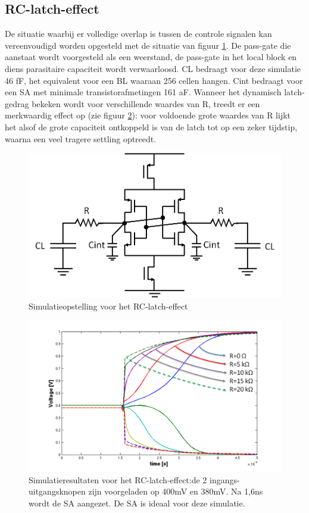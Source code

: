 \subsection{RC-latch-effect}
\label{RC-latch-effect}
De situatie waarbij er volledige overlap is tussen de controle signalen kan vereenvoudigd worden opgesteld met de situatie van figuur \ref{fig:RC-latch}. De pass-gate die aanstaat wordt voorgesteld als een weerstand, de pass-gate in het local block en diens parasitaire capaciteit wordt verwaarloosd. CL bedraagt voor deze simulatie 46 fF, het equivalent voor een BL waaraan 256 cellen hangen. Cint bedraagt voor een SA met minimale transistorafmetingen 161 aF. Wanneer het dynamisch latch-gedrag bekeken wordt voor verschillende waardes van R, treedt er een merkwaardig effect op (zie figuur \ref{fig:RC-latch-sim}): voor voldoende grote waardes van R lijkt het alsof de grote capaciteit ontkoppeld is van de latch tot op een zeker tijdstip, waarna een veel tragere settling optreedt.
\begin{figure}
  \centering
  \includegraphics[scale=0.4]{../fig/hfdstk-sensamp-RC-latch.png}
  \caption[Simulatieopstelling voor het RC-latch-effect]{Simulatieopstelling voor het RC-latch-effect}
  \label{fig:RC-latch}
\end{figure}
\begin{figure}
  \centering
  \includegraphics[scale=0.4]{../fig/hfdstk-sensamp-RC-latch-sim.png}
  \caption[Simulatieresultaten voor het RC-latch-effect]{Simulatieresultaten voor het RC-latch-effect:de 2 ingangs-uitgangsknopen zijn voorgeladen op 400mV en 380mV. Na 1,6ns wordt de SA aangezet. De SA is ideaal voor deze simulatie.}
  \label{fig:RC-latch-sim}
\end{figure}
